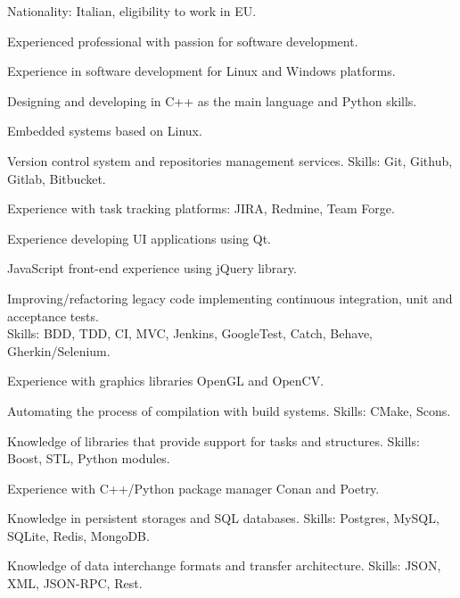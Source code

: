 

\begin{cvparagraph}

  \begin{svitems}
    \item {Nationality: Italian, eligibility to work in EU.}
    \item {Experienced professional with passion for software development.}
    \item {Experience in software development for Linux and Windows platforms.}
    \item {Designing and developing in C++ as the main language and Python skills.}
    \item {Embedded systems based on Linux.}
    \item {Version control system and repositories management services. Skills: Git, Github, Gitlab, Bitbucket.}
    \item {Experience with task tracking platforms: JIRA, Redmine, Team Forge.}
    \item {Experience developing UI applications using Qt.}
    \item {JavaScript front-end experience using jQuery library.}
    \item {Improving/refactoring legacy code implementing continuous integration, unit and acceptance tests.\\
    Skills: BDD, TDD, CI, MVC, Jenkins, GoogleTest, Catch, Behave, Gherkin/Selenium.}
    \item {Experience with graphics libraries OpenGL and OpenCV.}
    \item {Automating the process of compilation with build systems. Skills: CMake, Scons.}
    \item {Knowledge of libraries that provide support for tasks and structures. Skills: Boost, STL, Python modules.}
    \item {Experience with C++/Python package manager Conan and Poetry.}
    \item {Knowledge in persistent storages and SQL databases. Skills: Postgres, MySQL, SQLite, Redis, MongoDB.}
    \item {Knowledge of data interchange formats and transfer architecture. Skills: JSON, XML, JSON-RPC, Rest.}

\end{svitems}
\end{cvparagraph}
